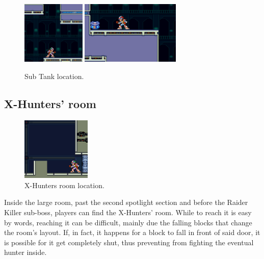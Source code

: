 \begin{figure}[htp]
	\centering
	\includegraphics[height=3cm]{figures/X2/Magna_centipede/Centipede_tank_1.png}
	\includegraphics[height=3cm]{figures/X2/Magna_centipede/Centipede_tank.png}
	\caption{Sub Tank location.}
\end{figure}

\subsection{X-Hunters' room}
\begin{figure}[htp]
	\centering
	\includegraphics[height=3cm]{figures/X2/Magna_centipede/Centipede_Hunter_room.png}
	\caption{X-Hunters room location.}
\end{figure}
Inside the large room, past the second spotlight section and before the Raider Killer sub-boss, players can find  the X-Hunters' room. While to reach it is easy by words, reaching it can be difficult, mainly due the falling blocks that change the room's layout. If, in fact, it happens for a block to fall in front of said door, it is possible for it get completely shut, thus preventing from fighting the eventual hunter inside. 

